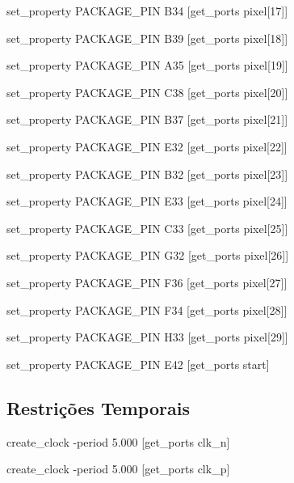 set\_property PACKAGE\_PIN B34 [get\_ports {pixel[17]}]

set\_property PACKAGE\_PIN B39 [get\_ports {pixel[18]}]

set\_property PACKAGE\_PIN A35 [get\_ports {pixel[19]}]

set\_property PACKAGE\_PIN C38 [get\_ports {pixel[20]}]

set\_property PACKAGE\_PIN B37 [get\_ports {pixel[21]}]

set\_property PACKAGE\_PIN E32 [get\_ports {pixel[22]}]

set\_property PACKAGE\_PIN B32 [get\_ports {pixel[23]}]

set\_property PACKAGE\_PIN E33 [get\_ports {pixel[24]}]

set\_property PACKAGE\_PIN C33 [get\_ports {pixel[25]}]

set\_property PACKAGE\_PIN G32 [get\_ports {pixel[26]}]

set\_property PACKAGE\_PIN F36 [get\_ports {pixel[27]}]

set\_property PACKAGE\_PIN F34 [get\_ports {pixel[28]}]

set\_property PACKAGE\_PIN H33 [get\_ports {pixel[29]}]

set\_property PACKAGE\_PIN E42 [get\_ports start]

\subsection{Restrições Temporais} \label{ap2:timing_cnstrs}

create\_clock -period 5.000 [get\_ports clk\_n]

create\_clock -period 5.000 [get\_ports clk\_p]